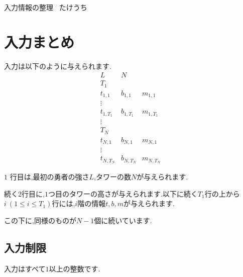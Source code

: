 \documentclass[a4paper,10pt]{ltjsarticle}
\begin{document}
\begin{center}
  {\LARGE 入力情報の整理}\
  \vskip6.5pt
  {\large たけうち}\
  \vskip2pt
  {\large }
\end{center}
\section*{入力まとめ}
入力は以下のように与えられます.
\begin{equation*}
  \begin{array}{ccc}
    L & N &  \\
    T_1 &  & \\
    t_{1,1} & b_{1,1} & m_{1,1} \\
    \vdots && \\
    t_{1, T_1} & b_{1, T_1} & m_{1, T_1}\\
    \vdots \\
    T_N \\
    t_{N,1} & b_{N,1} & m_{N,1}\\
    \vdots \\
    t_{N, T_N} & b_{N, T_N} & m_{N, T_N}
  \end{array}
\end{equation*}


$1$ 行目は,最初の勇者の強さ$L$,タワーの数$N$が与えられます.

続く$2$行目に,$1$つ目のタワーの高さが与えられます.以下に続く$T_1$行の上から$i\ (1\leq i \leq T_1)$行には,$i$階の情報$t,b,m$が与えられます.

この下に,同様のものが$N-1$個に続いています.

\subsection*{入力制限}

入力はすべて$1$以上の整数です.
\end{document}
